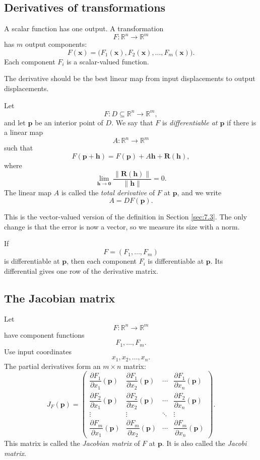 \subsection{Derivatives of transformations}

A scalar function has one output.  A transformation
\[
    F:\mathbb R^n\to\mathbb R^m
\]
has \(m\) output components:
\[
    F(\mathbf x)=
    \bigl(F_1(\mathbf x),F_2(\mathbf x),\ldots,F_m(\mathbf x)\bigr).
\]
Each component \(F_i\) is a scalar-valued function.

The derivative should be the best linear map from input displacements to output
displacements.

\begin{definition}
Let
\[
    F:D\subseteq\mathbb R^n\to\mathbb R^m,
\]
and let \(\mathbf p\) be an interior point of \(D\).  We say that \(F\) is
\emph{differentiable at \(\mathbf p\)} if there is a linear map
\[
    A:\mathbb R^n\to\mathbb R^m
\]
such that
\[
\boxed{
    F(\mathbf p+\mathbf h)
    =
    F(\mathbf p)+A\mathbf h+\mathbf R(\mathbf h),
}
\]
where
\[
\boxed{
    \lim_{\mathbf h\to\mathbf 0}
    \frac{\|\mathbf R(\mathbf h)\|}{\|\mathbf h\|}=0.
}
\]
The linear map \(A\) is called the \emph{total derivative} of \(F\) at \(\mathbf p\), and
we write
\[
    A=DF(\mathbf p).
\]
\end{definition}

This is the vector-valued version of the definition in Section \ref{sec:7.3}.  The only
change is that the error is now a vector, so we measure its size with a norm.

If
\[
    F=(F_1,\ldots,F_m)
\]
is differentiable at \(\mathbf p\), then each component \(F_i\) is differentiable at
\(\mathbf p\).  Its differential gives one row of the derivative matrix.

\subsection{The Jacobian matrix}

Let
\[
    F:\mathbb R^n\to\mathbb R^m
\]
have component functions
\[
    F_1,\ldots,F_m.
\]
Use input coordinates
\[
    x_1,x_2,\ldots,x_n.
\]
The partial derivatives form an \(m\times n\) matrix:
\[
\boxed{
J_F(\mathbf p)
=
\begin{pmatrix}
\dfrac{\partial F_1}{\partial x_1}(\mathbf p)
&
\dfrac{\partial F_1}{\partial x_2}(\mathbf p)
&
\cdots
&
\dfrac{\partial F_1}{\partial x_n}(\mathbf p)
\\[3mm]
\dfrac{\partial F_2}{\partial x_1}(\mathbf p)
&
\dfrac{\partial F_2}{\partial x_2}(\mathbf p)
&
\cdots
&
\dfrac{\partial F_2}{\partial x_n}(\mathbf p)
\\
\vdots & \vdots & \ddots & \vdots
\\[1mm]
\dfrac{\partial F_m}{\partial x_1}(\mathbf p)
&
\dfrac{\partial F_m}{\partial x_2}(\mathbf p)
&
\cdots
&
\dfrac{\partial F_m}{\partial x_n}(\mathbf p)
\end{pmatrix}.
}
\]
This matrix is called the \emph{Jacobian matrix} of \(F\) at \(\mathbf p\).  It is also
called the \emph{Jacobi matrix}.

